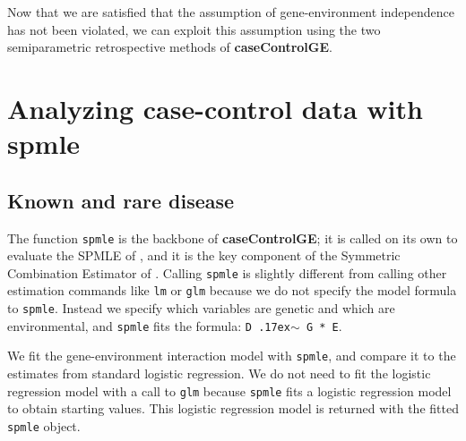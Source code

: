 \documentclass[11pt,]{article}
\newenvironment{Shaded}{\begin{snugshade}}{\end{snugshade}}
\newcommand{\KeywordTok}[1]{\textcolor[rgb]{0.13,0.29,0.53}{\textbf{#1}}}
\newcommand{\DataTypeTok}[1]{\textcolor[rgb]{0.13,0.29,0.53}{#1}}
\newcommand{\DecValTok}[1]{\textcolor[rgb]{0.00,0.00,0.81}{#1}}
\newcommand{\FloatTok}[1]{\textcolor[rgb]{0.00,0.00,0.81}{#1}}
\newcommand{\StringTok}[1]{\textcolor[rgb]{0.31,0.60,0.02}{#1}}
\newcommand{\OperatorTok}[1]{\textcolor[rgb]{0.81,0.36,0.00}{\textbf{#1}}}
\newcommand{\NormalTok}[1]{#1}
\begin{document}
Now that we are satisfied that the assumption of gene-environment
independence has not been violated, we can exploit this assumption using
the two semiparametric retrospective methods of \textbf{caseControlGE}.

\section{Analyzing case-control data with spmle} \label{sec:spmle}

\subsection{Known and rare disease} \label{sec:spmle.knownRare}

The function \texttt{spmle} is the backbone of \textbf{caseControlGE};
it is called on its own to evaluate the SPMLE of
\citeauthor{Stalder2017}, and it is the key component of the Symmetric
Combination Estimator of \citeauthor{Wang2018unpublished}. Calling
\texttt{spmle} is slightly different from calling other estimation
commands like \texttt{lm} or \texttt{glm} because we do not specify the
model formula to \texttt{spmle}. Instead we specify which variables are
genetic and which are environmental, and \texttt{spmle} fits the
formula: \texttt{D {\raise.17ex\hbox{$\scriptstyle\sim$}} G * E}.

We fit the gene-environment interaction model with \texttt{spmle}, and
compare it to the estimates from standard logistic regression. We do not
need to fit the logistic regression model with a call to \texttt{glm}
because \texttt{spmle} fits a logistic regression model to obtain
starting values. This logistic regression model is returned with the
fitted \texttt{spmle} object.

\begin{Shaded}
\end{Shaded}
\end{document}
